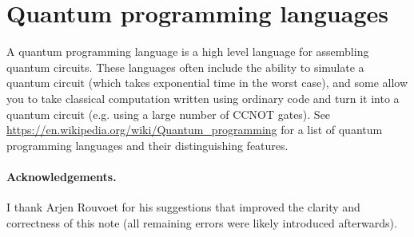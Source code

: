 \documentclass[a4paper, 11pt]{article}
\theoremstyle{definition}
\begin{document}
\section{Quantum programming languages}

A quantum programming language is a high level language for assembling quantum circuits.
These languages often include the ability to simulate a quantum circuit (which takes exponential time in the worst case),
and some allow you to take classical computation written using ordinary code and turn it into a quantum circuit (e.g. using a large number of CCNOT gates).
See \url{https://en.wikipedia.org/wiki/Quantum_programming} for a list of quantum programming languages and their distinguishing features.

\paragraph{Acknowledgements.}
I thank Arjen Rouvoet for his suggestions that improved the clarity and correctness of this note (all remaining errors were likely introduced afterwards).



\end{document}

